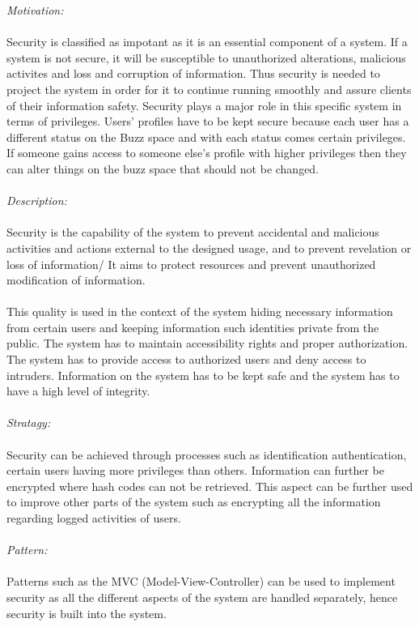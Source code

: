 \documentclass[a4paper,12pt]{report}
\begin{document}
		\emph{Motivation: }\\\\ Security is classified as impotant as it is an essential component of a system. If a system is not secure, it will be susceptible to unauthorized alterations, malicious activites and loss and corruption of information. Thus security is needed to project the system in order for it to continue running smoothly and assure clients of their information safety. Security plays a major role in this specific system in terms of privileges. Users' profiles have to be kept secure because each user has a different status on the Buzz space and with each status comes certain privileges. If someone gains access to someone else's profile with higher privileges then they can alter things on the buzz space that should not be changed. \\\\
		
		\emph{Description: }\\\\ Security is the capability of the system to prevent accidental  and malicious activities and actions external to the designed usage, and to prevent revelation or loss of information/ It aims to protect resources and prevent unauthorized modification of information.\\\\
		This quality is used in the context of the system hiding necessary information from certain users and keeping information such identities private from the public. The system has to maintain accessibility rights and proper authorization. The system has to provide access to authorized users and deny access to intruders. Information on the system has to be kept safe and the system has to have a high level of integrity.\\\\
		
		\emph{Stratagy: }\\\\ Security can be achieved through processes such as identification authentication, certain users having more privileges than others. Information can further be encrypted where hash codes can not be retrieved. This aspect can be further used to improve other parts of the system such as encrypting all the information regarding logged activities of users.\\\\
		
		\emph{Pattern: } \\\\ Patterns such as the MVC (Model-View-Controller) can be used to implement security as all the different aspects of the system are handled separately, hence security is built into the system.\\
			
\end{document}
